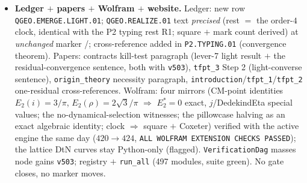 \begin{itemize}[leftmargin=1.5em]
analogue): B-rigidity in the sharpened form ``RP seam data $\Rightarrow$ order-$4$ clock'' is the
live route. \texttt{v215} lever 7 thereby moves from ``deferred, not executable'' to ``light version
executed: rigidity, not dynamical selection'' --- documented in \texttt{v503}, \texttt{v215} itself
unchanged.
\item \textbf{Ledger $+$ papers $+$ Wolfram $+$ website.} Ledger: new row
\texttt{QGEO.EMERGE.LIGHT.01}; \texttt{QGEO.REALIZE.01} text \emph{precised} (rest $=$ the order-$4$
clock, identical with the P2 typing rest R1; square $+$ mark count derived) at \emph{unchanged}
marker \mC/\mO; cross-reference added in \texttt{P2.TYPING.01} (convergence theorem). Papers:
contracts kill-test paragraph (lever-7 light result $+$ the residual-convergence sentence, both with
\texttt{v503}), \texttt{tfpt\_3} Step 2 (light-converse sentence), \texttt{origin\_theory}
necessity paragraph, \texttt{introduction}/\texttt{tfpt\_1}/\texttt{tfpt\_2} one-residual
cross-references. Wolfram: four mirrors (CM-point identities $E_2(i)=3/\pi$, $E_2(\rho)=2\sqrt3/\pi$
$\Rightarrow$ $E_2^*=0$ exact, $j$/DedekindEta special values; the no-dynamical-selection witnesses;
the pillowcase halving as an exact algebraic identity; clock $\Rightarrow$ square $+$ Coxeter)
verified with the active engine the same day ($420\to424$, \texttt{ALL WOLFRAM EXTENSION CHECKS
PASSED}); the lattice DtN curves stay Python-only (flagged). \texttt{VerificationDag} masses node
gains \texttt{v503}; registry $+$ \texttt{run\_all} (497 modules, suite green). No gate closes, no
marker moves.
\end{itemize}

